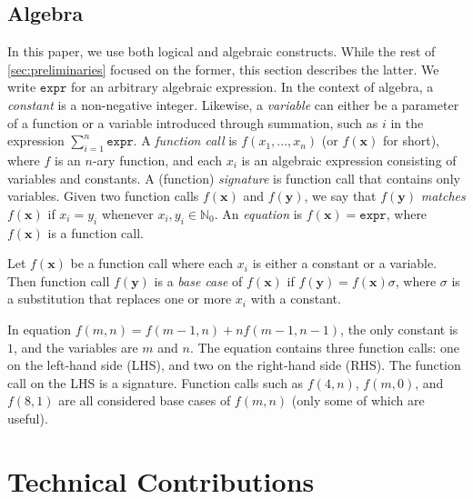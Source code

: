 \documentclass[a4paper,UKenglish,cleveref, autoref, thm-restate]{lipics-v2021}
\newcommand{\expr}{\mathtt{expr}}
\begin{document}
\subsection{Algebra}\label{sec:algebra}

In this paper, we use both logical and algebraic constructs. While the rest of
\cref{sec:preliminaries} focused on the former, this section describes the
latter. We write $\expr{}$ for an arbitrary algebraic expression. In the context
of algebra, a \emph{constant} is a non-negative integer. Likewise, a
\emph{variable} can either be a parameter of a function or a variable introduced
through summation, such as $i$ in the expression $\sum_{i=1}^{n} \expr$. A
\emph{function call} is $f(x_{1}, \dots, x_{n})$ (or $f(\mathbf{x})$ for short),
where $f$ is an $n$-ary function, and each $x_{i}$ is an algebraic expression
consisting of variables and constants. A (function) \emph{signature} is function
call that contains only variables. Given two function calls $f(\mathbf{x})$ and
$f(\mathbf{y})$, we say that $f(\mathbf{y})$ \emph{matches} $f(\mathbf{x})$ if
$x_{i} = y_{i}$ whenever $x_{i}, y_{i} \in \mathbb{N}_{0}$. An \emph{equation}
is $f(\mathbf{x}) = \expr{}$, where $f(\mathbf{x})$ is a function call.

\begin{definition}\label{def:basecase}
  Let $f(\mathbf{x})$ be a function call where each $x_{i}$ is either a constant
  or a variable. Then function call $f(\mathbf{y})$ is a \emph{base case} of
  $f(\mathbf{x})$ if $f(\mathbf{y}) = f(\mathbf{x})\sigma$, where $\sigma$ is a
  substitution that replaces one or more $x_{i}$ with a constant.
\end{definition}

\begin{example}
  In equation $f(m, n) = f(m-1, n) + nf(m-1, n-1)$, the only constant is $1$,
  and the variables are $m$ and $n$. The equation contains three function calls:
  one on the left-hand side (LHS), and two on the right-hand side (RHS). The
  function call on the LHS is a signature. Function calls such as $f(4, n)$,
  $f(m, 0)$, and $f(8, 1)$ are all considered base cases of $f(m, n)$ (only some
  of which are useful).
\end{example}

\section{Technical Contributions}\label{sec:main}
\end{document}
